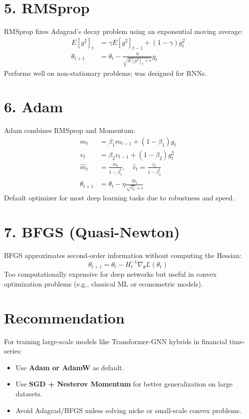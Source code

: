\documentclass[10pt]{article}
\begin{document}
\section*{5. RMSprop}
RMSprop fixes Adagrad’s decay problem using an exponential moving average:
\begin{align*}
E[g^2]_t &= \gamma E[g^2]_{t-1} + (1 - \gamma) g_t^2 \\
\theta_{t+1} &= \theta_t - \frac{\eta}{\sqrt{E[g^2]_t + \epsilon}} g_t
\end{align*}
Performs well on non-stationary problems; was designed for RNNs.

\section*{6. Adam}
Adam combines RMSprop and Momentum:
\begin{align*}
m_t &= \beta_1 m_{t-1} + (1 - \beta_1) g_t \\
v_t &= \beta_2 v_{t-1} + (1 - \beta_2) g_t^2 \\
\hat{m}_t &= \frac{m_t}{1 - \beta_1^t},\quad \hat{v}_t = \frac{v_t}{1 - \beta_2^t} \\
\theta_{t+1} &= \theta_t - \eta \frac{\hat{m}_t}{\sqrt{\hat{v}_t} + \epsilon}
\end{align*}
Default optimizer for most deep learning tasks due to robustness and speed.

\section*{7. BFGS (Quasi-Newton)}
BFGS approximates second-order information without computing the Hessian:
\[
\theta_{t+1} = \theta_t - H_t^{-1} \nabla_\theta L(\theta_t)
\]
Too computationally expensive for deep networks but useful in convex optimization problems (e.g., classical ML or econometric models).

\section*{Recommendation}
For training large-scale models like Transformer-GNN hybrids in financial time-series:
\begin{itemize}[leftmargin=*]
  \item Use \textbf{Adam or AdamW} as default.
  \item Use \textbf{SGD + Nesterov Momentum} for better generalization on large datasets.
  \item Avoid Adagrad/BFGS unless solving niche or small-scale convex problems.
\end{itemize}
\end{document}
